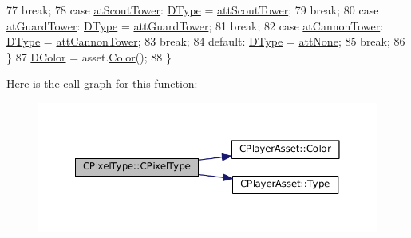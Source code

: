 \begin{DoxyCode}
77                                 \textcolor{keywordflow}{break};
78         \textcolor{keywordflow}{case} \hyperlink{GameDataTypes_8h_a5600d4fc433b83300308921974477fecab8835f936f9ce8c2df6c201e542fbfcd}{atScoutTower}:      \hyperlink{classCPixelType_aca37f042b510a349e0d3209c73ae51c5}{DType} = \hyperlink{classCPixelType_af06457fd1c2ff34c67ce670e633a10b0a734772bfa3f575ca8811485873e2478b}{attScoutTower};
79                                 \textcolor{keywordflow}{break};
80         \textcolor{keywordflow}{case} \hyperlink{GameDataTypes_8h_a5600d4fc433b83300308921974477feca65fa6c84ff93972a623793d4ee72d87f}{atGuardTower}:      \hyperlink{classCPixelType_aca37f042b510a349e0d3209c73ae51c5}{DType} = \hyperlink{classCPixelType_af06457fd1c2ff34c67ce670e633a10b0ab5afa80bf72a1e1fd366490591794229}{attGuardTower};
81                                 \textcolor{keywordflow}{break};
82         \textcolor{keywordflow}{case} \hyperlink{GameDataTypes_8h_a5600d4fc433b83300308921974477feca226f6f1968ce76c97cdabb780a6c289d}{atCannonTower}:     \hyperlink{classCPixelType_aca37f042b510a349e0d3209c73ae51c5}{DType} = \hyperlink{classCPixelType_af06457fd1c2ff34c67ce670e633a10b0a9220629e324fc6cfb6eb9e0f9853354c}{attCannonTower};
83                                 \textcolor{keywordflow}{break};
84         \textcolor{keywordflow}{default}:                \hyperlink{classCPixelType_aca37f042b510a349e0d3209c73ae51c5}{DType} = \hyperlink{classCPixelType_af06457fd1c2ff34c67ce670e633a10b0a19050fdb98082f54b7a4e9365912763b}{attNone};
85                                 \textcolor{keywordflow}{break};
86     \}
87     \hyperlink{classCPixelType_a474243cf748aee94cfa207659e940b6c}{DColor} = asset.\hyperlink{classCPlayerAsset_a969e6e60c6343186d2b9a6cddd6654f8}{Color}();
88 \}
\end{DoxyCode}
Here is the call graph for this function\+:\nopagebreak
\begin{figure}[H]
\begin{center}
\leavevmode
\includegraphics[width=350pt]{classCPixelType_abf05fa378b6e924c40d3616d6c718557_cgraph}
\end{center}
\end{figure}
\hypertarget{classCPixelType_a393a54c12c99809690961764f8f002fe}{}\label{classCPixelType_a393a54c12c99809690961764f8f002fe} 
